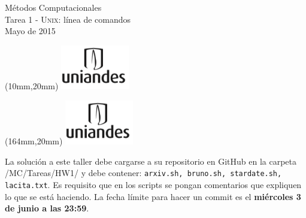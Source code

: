 \documentclass[11pt,letterpaper]{exam}
\begin{document}
\begin{center}
{\Large Métodos Computacionales} \\
Tarea 1 - \textsc{Unix}: línea de comandos \\
Mayo de 2015
\end{center}

\begin{textblock*}{40mm}(10mm,20mm)
  \includegraphics[width=3cm]{logoUniandes.png}
\end{textblock*}

\begin{textblock*}{40mm}(164mm,20mm)
  \includegraphics[width=3cm]{logoUniandes.png}
\end{textblock*}

\vspace{0.5cm}

La solución a este taller debe cargarse a su repositorio en GitHub en la carpeta /MC/Tareas/HW1/ y debe contener: \verb+arxiv.sh, bruno.sh, stardate.sh, lacita.txt+. Es requisito que en los scripts se pongan comentarios que expliquen lo que se está haciendo. La fecha límite para hacer un commit es el \textbf{miércoles 3 de junio a las 23:59}.

\vspace{0.5cm}
\end{document}
